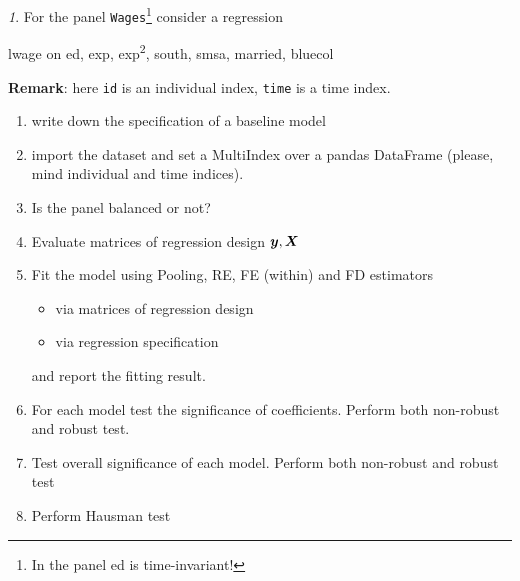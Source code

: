\documentclass[12pt]{article}
\theoremstyle{remark}
\newtheorem{exercise}{}[section]
\begin{document}
\begin{exercise}
For the panel \texttt{Wages}\footnote{In the panel ed is time-invariant!} 
consider a regression
\begin{center}
	lwage on ed, exp, exp\textsuperscript2, south, smsa, married, bluecol 
\end{center}
\textbf{Remark}: here \texttt{id} is an individual index, 
\texttt{time} is a time index.
\begin{enumerate}
	\item write down the specification of a baseline model
	\item import the dataset and set a MultiIndex over a pandas DataFrame 
	(please, mind  individual and time indices).
	\item Is the panel balanced or not?
	\item Evaluate matrices of regression design \({\bm y}, {\bm X}\)
	\item Fit the model using Pooling, RE, FE (within) and FD estimators
	\begin{itemize}
		\item via matrices of regression design
		\item via regression specification
	\end{itemize}
	and report the fitting result.
	\item For each model test the significance of coefficients. Perform both
	non-robust and robust test.
	\item Test overall significance of each model. Perform both
	non-robust and robust test
	\item Perform Hausman test
\end{enumerate}
\end{exercise}
\end{document}
